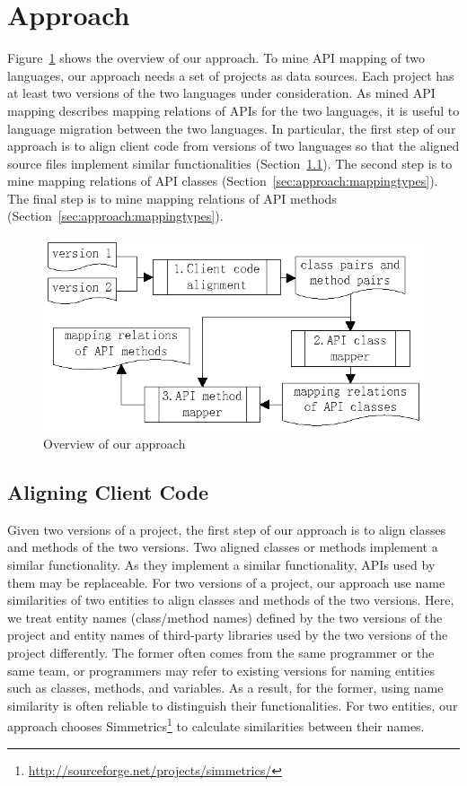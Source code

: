 \section{Approach}
\label{sec:approach}


Figure~\ref{fig:approach} shows the overview of our approach. To
mine API mapping of two languages, our approach needs a set of
projects as data sources. Each project has at least two versions of
the two languages under consideration. As mined API mapping
describes mapping relations of APIs for the two languages, it is
useful to language migration between the two languages. In
particular, the first step of our approach is to align client code
from versions of two languages so that the aligned source files
implement similar functionalities (Section~\ref{sec:approach:acc}).
The second step is to mine mapping relations of API classes
(Section~\ref{sec:approach:mappingtypes}). The final step is to mine
mapping relations of API methods
(Section~\ref{sec:approach:mappingtypes}).
\begin{figure}[t]
\centering
\includegraphics[scale=1,clip]{figure/approach.eps}\vspace*{-1.5ex}
 \caption{Overview of our approach}\vspace*{-3.5ex}
 \label{fig:approach}
\end{figure}
\subsection{Aligning Client Code}
\label{sec:approach:acc}

Given two versions of a project, the first step of our approach is
to align classes and methods of the two versions. Two aligned
classes or methods implement a similar functionality. As they
implement a similar functionality, APIs used by them may be
replaceable. For two versions of a project, our approach use name
similarities of two entities to align classes and methods of the two
versions. Here, we treat entity names (class/method names) defined
by the two versions of the project and entity names of third-party
libraries used by the two versions of the project differently. The
former often comes from the same programmer or the same team, or
programmers may refer to existing versions for naming entities such
as classes, methods, and variables. As a result, for the former,
using name similarity is often reliable to distinguish their
functionalities. For two entities, our approach chooses
Simmetrics\footnote{\url{http://sourceforge.net/projects/simmetrics/}}
to calculate similarities between their names.


